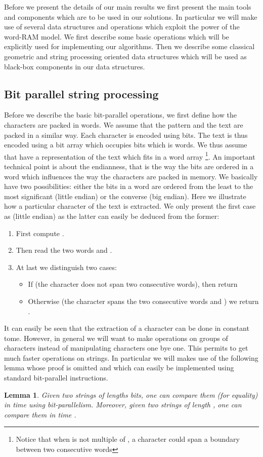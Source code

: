 \documentclass{article}
\newcommand{\?}{\mskip1.5mu}
\newtheorem{lemma}{Lemma}
\begin{document}
Before we present the details of our main results we first present the main tools and components which are to be used in our solutions. In particular we will make use of several data structures and operations which exploit the power of the word-RAM model. We first describe some basic operations which will be explicitly used for implementing our algorithms. Then we describe some classical geometric and string processing oriented data structures which will be used as black-box components in our data structures.  
\subsection{Bit parallel string processing}
Before we describe the basic bit-parallel operations, we first define how the characters are packed in words. We assume that the pattern and the text are packed in a similar way. Each character is encoded using  bits. The text  is thus encoded using a bit array  which occupies  bits which is  words. We thus assume that have a representation of the text  which fits in a word array  \footnote{Notice that when  is not multiple of  , a character could span a boundary between two consecutive words}. An important technical point is about the endianness, that is the way the bits are ordered in a word which influences the way the characters are packed in memory. We basically have two possibilities: either the bits in a word are ordered from the least to the most significant (little endian) or the converse (big endian). Here we illustrate how a particular character  of the text is extracted. We only present the first case as (little endian) as the latter can easily be deduced from the former: 
\begin{enumerate}
\item First compute .
\item Then read the two words  and .
\item At last we distinguish two cases: 
\begin{itemize}
\item If  (the character  does not span two consecutive words), then return  
\item Otherwise (the character spans the two consecutive words  and ) we return .
\end{itemize}
\end{enumerate}
It can easily be seen that the extraction of a character can be done in constant tome. However, in general we will want to make operations on groups of characters instead of manipulating characters one bye one. This permits to get much faster operations on strings. In particular we will makes use of the following lemma whose proof is omitted and which can easily be implemented using standard bit-parallel instructions. 
\begin{lemma}
Given two strings of lengths  bits, one can compare them (for equality) in  time using bit-parallelism. Moreover, given two strings of length , one can compare them in time . 
\end{lemma}
\end{document}
